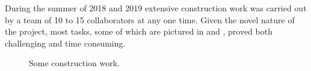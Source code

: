 During the summer of 2018 and 2019 extensive \chipsfive construction work was carried out by a
team of 10 to 15 collaborators at any one time. Given the novel nature of the project, most tasks,
some of which are pictured in  and , proved both
challenging and time consuming.

\begin{figure} %
    \centering
    \quad
    \caption[Some \chipsfive construction work]
    {Some \chipsfive construction work.}
    \label{fig:work1}
\end{figure}


